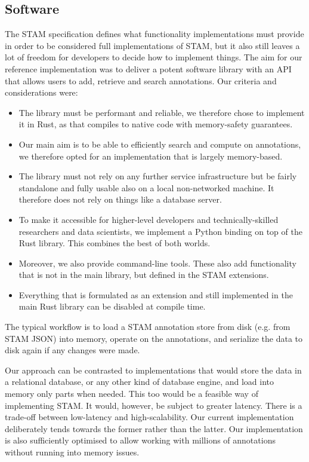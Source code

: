 \documentclass{jors}
\begin{document}
\subsection*{Software}

The STAM specification defines what functionality implementations must provide
in order to be considered full implementations of STAM, but it also still
leaves a lot of freedom for developers to decide how to implement things.  The
aim for our reference implementation was to deliver a potent software library
with an API that allows users to add, retrieve and search annotations. Our
criteria and considerations were:

\begin{itemize}
    \item The library must be performant and reliable, we therefore chose to implement it in Rust, as that compiles to native code with memory-safety guarantees.
    \item Our main aim is to be able to efficiently search and compute on annotations, we therefore opted for an implementation that is largely memory-based.
    \item The library must not rely on any further service infrastructure but be fairly standalone and fully usable also on a local non-networked machine. It therefore does not rely on things like a database server.
    \item To make it accessible for higher-level developers and technically-skilled researchers and data scientists, we implement a Python binding on top of the Rust library. This combines the best of both worlds.
    \item Moreover, we also provide command-line tools. These also add functionality that is not in the main library, but defined in the STAM extensions.
    \item Everything that is formulated as an extension and still implemented in the main Rust library can be disabled at compile time.
\end{itemize}

The typical workflow is to load a STAM annotation store from disk (e.g. from
STAM JSON) into memory, operate on the annotations, and serialize the data to
disk again if any changes were made.

Our approach can be contrasted to implementations that would store the data in
a relational database, or any other kind of database engine, and load into
memory only parts when needed. This too would be a feasible way of implementing
STAM. It would, however, be subject to greater latency. There is a trade-off
between low-latency and high-scalability. Our current implementation
deliberately tends towards the former rather than the latter. Our
implementation is also sufficiently optimised to allow working with millions of
annotations without running into memory issues.
\end{document}
